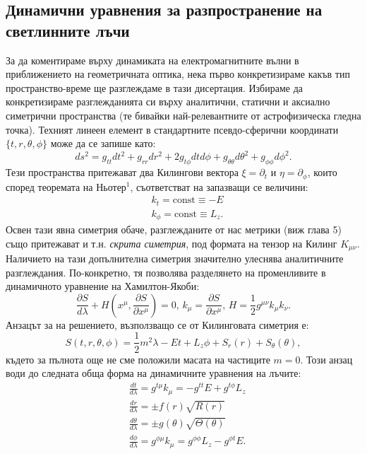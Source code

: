 \subsection{Динамични уравнения за разпространение на светлинните лъчи}
За да коментираме върху динамиката на електромагнитните вълни в приближението на геометричната оптика, нека първо конкретизираме какъв тип пространство-време ще разглеждаме в тази дисертация. Избираме да конкретизираме разглежданията си върху аналитични, статични и аксиално симетрични пространства (те бивайки най-релевантните от астрофизическа гледна точка). Техният линеен елемент в стандартните псевдо-сферични координати $\{t,r,\theta,\phi\}$ може да се запише като:
\begin{equation}
	ds^2 = g_{tt}dt^2 + g_{rr}dr^2 + 2g_{t\phi}dtd\phi + g_{\theta\theta}d\theta^2 + g_{\phi\phi} d\phi^2. 
\end{equation}
Тези пространства притежават два Килингови вектора $\xi = \partial_t$ и $\eta = \partial_\phi$, които според теоремата на Ньотер$^1$, съответстват на запазващи се величини:
\begin{subequations}
	\begin{align}
		&k_t = \text{const} \equiv -E\\
		&k_\phi = \text{const} \equiv L_z.
	\end{align}
\end{subequations}
Освен тази явна симетрия обаче, разглежданите от нас метрики (виж глава 5) също притежават и т.н. \emph{скрита симетрия}, под формата на тензор на Килинг $K_{\mu\nu}$. Наличието на тази допълнителна симетрия значително улеснява аналитичните разглеждания. По-конкретно, тя позволява разделянето на променливите в динамичното уравнение на Хамилтон-Якоби:
\begin{equation}
	\frac{\partial S}{d\lambda} + H\left(x^\mu,\frac{\partial S}{\partial x^\mu}\right) = 0, \,k_\mu = \frac{\partial S}{\partial x^\mu},\, H = \frac{1}{2}g^{\mu\nu}k_\mu k_\nu.
\end{equation}
Анзацът за на решението, възползващо се от Килинговата симетрия е:
\begin{equation}
	S(t,r,\theta,\phi) = \frac{1}{2}m^2\lambda -Et + L_z\phi + S_r(r) + S_\theta(\theta),
\end{equation}
където за пълнота още не сме положили масата на частиците $m = 0$. Този анзац води до следната обща форма на динамичните уравнения на лъчите:
\begin{subequations}
	\begin{align}
		&\frac{dt}{d\lambda} = g^{t\mu}k_\mu = -g^{tt}E + g^{t\phi}L_z\\
		&\frac{dr}{d\lambda} = \pm f(r)\sqrt{R(r)}\\
		&\frac{d\theta}{d\lambda} = \pm g(\theta)\sqrt{\Theta(\theta)}\\
		&\frac{d\phi}{d\lambda} = g^{\phi\mu}k_\mu = g^{\phi\phi}L_z - g^{\phi t}E.
	\end{align}
\end{subequations}
